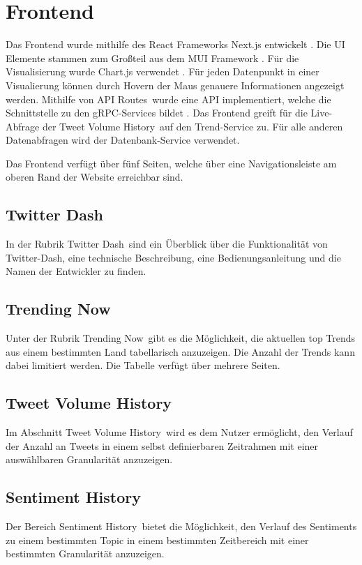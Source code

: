 \documentclass[conference]{IEEEtran}
\begin{document}
\section{Frontend}
Das Frontend wurde mithilfe des React Frameworks Next.js entwickelt \cite{nextjs}.
Die UI Elemente stammen zum Großteil aus dem MUI Framework \cite{mui}.
Für die Visualisierung wurde Chart.js verwendet \cite{chartjs}.
Für jeden Datenpunkt in einer Visualierung können durch Hovern der Maus genauere Informationen angezeigt werden.
Mithilfe von \glqq API Routes\grqq\ wurde eine API implementiert, welche die Schnittstelle zu den gRPC-Services bildet \cite{apiroutes}.
Das Frontend greift für die Live-Abfrage der \glqq Tweet Volume History\grqq\ auf den Trend-Service zu.
Für alle anderen Datenabfragen wird der Datenbank-Service verwendet.

Das Frontend verfügt über fünf Seiten, welche über eine Navigationsleiste am oberen Rand der Website erreichbar sind.

\subsection*{Twitter Dash}
In der Rubrik \glqq Twitter Dash\grqq\ sind ein Überblick über die Funktionalität von Twitter-Dash,
eine technische Beschreibung, eine Bedienungsanleitung und die Namen der Entwickler zu finden.
\subsection*{Trending Now}
Unter der Rubrik \glqq Trending Now\grqq\ gibt es die Möglichkeit, die aktuellen top Trends aus einem bestimmten Land tabellarisch anzuzeigen.
Die Anzahl der Trends kann dabei limitiert werden. Die Tabelle verfügt über mehrere Seiten.
\subsection*{Tweet Volume History}
Im Abschnitt \glqq Tweet Volume History\grqq\ wird es dem Nutzer ermöglicht, den Verlauf der Anzahl an Tweets in einem selbst definierbaren Zeitrahmen
mit einer auswählbaren Granularität anzuzeigen.
\subsection*{Sentiment History}
Der Bereich \glqq Sentiment History\grqq\ bietet die Möglichkeit, den Verlauf des Sentiments zu einem bestimmten Topic in einem bestimmten Zeitbereich mit einer bestimmten Granularität anzuzeigen.
\end{document}
